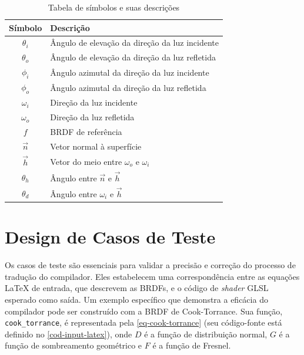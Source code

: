 \begin{table}[h]
    \centering
    \begin{tabular}{cl}
        \hline
        \textbf{Símbolo} & \textbf{Descrição} \\
        \hline
        $\theta_i$ & Ângulo de elevação da direção da luz incidente \\
        \hline
        $\theta_o$ & Ângulo de elevação da direção da luz refletida \\
        \hline
        $\phi_i$ & Ângulo azimutal da direção da luz incidente \\
        \hline
        $\phi_o$ & Ângulo azimutal da direção da luz refletida \\
        \hline
        $\omega_i$ & Direção da luz incidente  \\
        \hline
        $\omega_o$ & Direção da luz refletida  \\
        \hline
        $f$ & BRDF de referência \\
        \hline
        $\vec{n}$ & Vetor normal à superfície \\
        \hline
        $\vec{h}$ & Vetor do meio entre $\omega_o$ e $\omega_i$ \\
        \hline
        $\theta_h$ & Ângulo entre $\vec{n}$ e $\vec{h}$ \\
        \hline
        $\theta_d$ & Ângulo entre $\omega_i$ e $\vec{h}$ \\
        \hline
    \end{tabular}
    \caption{Tabela de símbolos e suas descrições}
    \label{tab-conventions-metodologia}
\end{table}
%
%
\section{Design de Casos de Teste} \label{testes}
%
%
Os casos de teste são essenciais para validar a precisão e correção do processo de tradução do compilador. Eles estabelecem uma correspondência entre as equações \LaTeX{} de entrada, que descrevem as BRDFs, e o código de \textit{shader} GLSL esperado como saída. Um exemplo específico que demonstra a eficácia do compilador pode ser construído com a BRDF de Cook-Torrance. Sua função, \texttt{cook\_torrance}, é representada pela \autoref{eq-cook-torrance} (seu código-fonte está definido no \autoref{cod-input-latex}), onde \(D\) é a função de distribuição normal, \(G\) é a função de sombreamento geométrico e \(F\) é a função de Fresnel.

